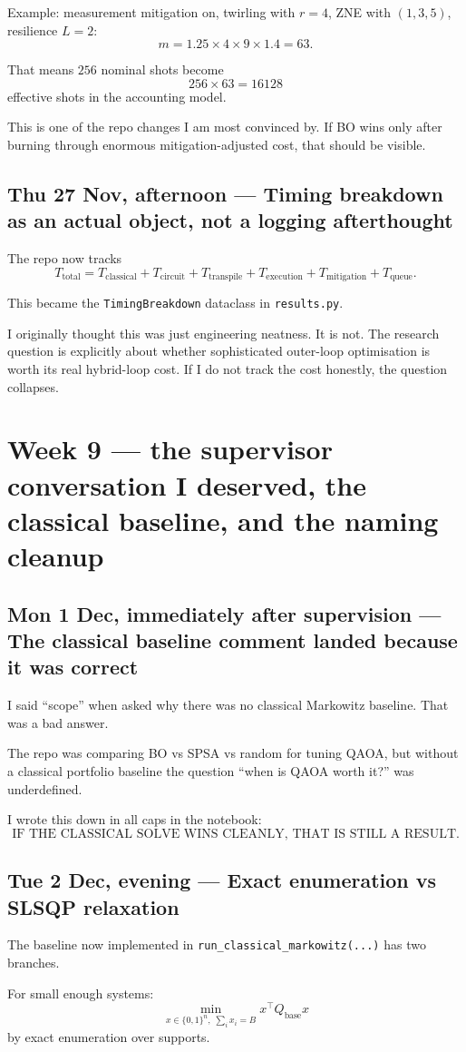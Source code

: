 \documentclass[11pt]{article}
\newcommand{\entry}[2]{\subsection*{#1 --- #2}}
\newcommand{\repo}[1]{\texttt{#1}}
\begin{document}
Example:
measurement mitigation on, twirling with \(r=4\), ZNE with \((1,3,5)\), resilience \(L=2\):
\[
m = 1.25 \times 4 \times 9 \times 1.4 = 63.
\]

That means \(256\) nominal shots become
\[
256 \times 63 = 16128
\]
effective shots in the accounting model.

This is one of the repo changes I am most convinced by. If BO wins only after burning through
enormous mitigation-adjusted cost, that should be visible.

\entry{Thu 27 Nov, afternoon}{Timing breakdown as an actual object, not a logging afterthought}

The repo now tracks
\[
T_{\text{total}}
=
T_{\text{classical}}
+ T_{\text{circuit}}
+ T_{\text{transpile}}
+ T_{\text{execution}}
+ T_{\text{mitigation}}
+ T_{\text{queue}}.
\]

This became the \repo{TimingBreakdown} dataclass in \repo{results.py}.

I originally thought this was just engineering neatness.
It is not.
The research question is explicitly about whether sophisticated outer-loop optimisation is worth
its real hybrid-loop cost. If I do not track the cost honestly, the question collapses.

\section*{Week 9 --- the supervisor conversation I deserved, the classical baseline, and the naming cleanup}

\entry{Mon 1 Dec, immediately after supervision}{The classical baseline comment landed because it was correct}

I said ``scope'' when asked why there was no classical Markowitz baseline.
That was a bad answer.

The repo was comparing BO vs SPSA vs random for tuning QAOA, but without a classical portfolio
baseline the question ``when is QAOA worth it?'' was underdefined.

I wrote this down in all caps in the notebook:
\[
\text{IF THE CLASSICAL SOLVE WINS CLEANLY, THAT IS STILL A RESULT.}
\]

\entry{Tue 2 Dec, evening}{Exact enumeration vs SLSQP relaxation}

The baseline now implemented in \repo{run\_classical\_markowitz(...)} has two branches.

For small enough systems:
\[
\min_{x \in \{0,1\}^n,\; \sum_i x_i = B} x^\top Q_{\text{base}} x
\]
by exact enumeration over supports.
\end{document}
